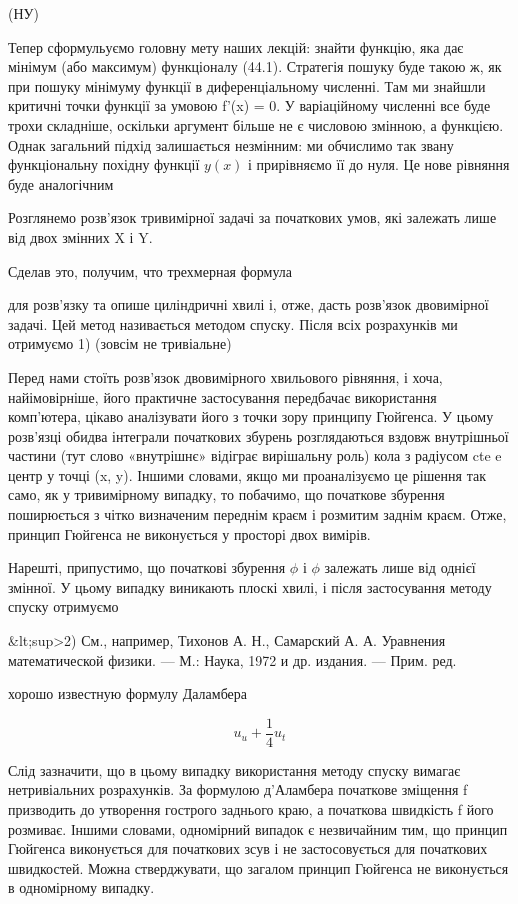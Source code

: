 \documentclass[
  ukrainian,
]{article}
\begin{document}
(НУ)

Тепер сформульуємо головну мету наших лекцій: знайти функцію, яка дає
мінімум (або максимум) функціоналу (44.1). Стратегія пошуку буде такою
ж, як при пошуку мінімуму функції в диференціальному численні. Там ми
знайшли критичні точки функції за умовою f'(x) = 0. У варіаційному
численні все буде трохи складніше, оскільки аргумент більше не є
числовою змінною, а функцією. Однак загальний підхід залишається
незмінним: ми обчислимо так звану функціональну похідну функції \(y(x)\)
і прирівняємо її до нуля. Це нове рівняння буде аналогічним

Розглянемо розв'язок тривимірної задачі за початкових умов, які залежать
лише від двох змінних X і Y.

Сделав это, получим, что трехмерная формула

для розв'язку та опише циліндричні хвилі і, отже, дасть розв'язок
двовимірної задачі. Цей метод називається методом спуску. Після всіх
розрахунків ми отримуємо 1) (зовсім не тривіальне)

Перед нами стоїть розв'язок двовимірного хвильового рівняння, і хоча,
найімовірніше, його практичне застосування передбачає використання
комп'ютера, цікаво аналізувати його з точки зору принципу Гюйгенса. У
цьому розв'язці обидва інтеграли початкових збурень розглядаються вздовж
внутрішньої частини (тут слово «внутрішнє» відіграє вирішальну роль)
кола з радіусом cte e центр у точці (x, y). Іншими словами, якщо ми
проаналізуємо це рішення так само, як у тривимірному випадку, то
побачимо, що початкове збурення поширюється з чітко визначеним переднім
краєм і розмитим заднім краєм. Отже, принцип Гюйгенса не виконується у
просторі двох вимірів.

Нарешті, припустимо, що початкові збурення \(\phi\) і \(\phi\) залежать
лише від однієї змінної. У цьому випадку виникають плоскі хвилі, і після
застосування методу спуску отримуємо

\&lt;sup\textgreater2) См., например, Тихонов А. Н., Самарский А. А.
Уравнения математической физики. --- М.: Наука, 1972 и др. издания. ---
Прим. ред.

хорошо известную формулу Даламбера

\[
u_u + \frac{1}{4} u_t
\]

Слід зазначити, що в цьому випадку використання методу спуску вимагає
нетривіальних розрахунків. За формулою д'Аламбера початкове зміщення f
призводить до утворення гострого заднього краю, а початкова швидкість f
його розмиває. Іншими словами, одномірний випадок є незвичайним тим, що
принцип Гюйгенса виконується для початкових зсув і не застосовується для
початкових швидкостей. Можна стверджувати, що загалом принцип Гюйгенса
не виконується в одномірному випадку.
\end{document}

